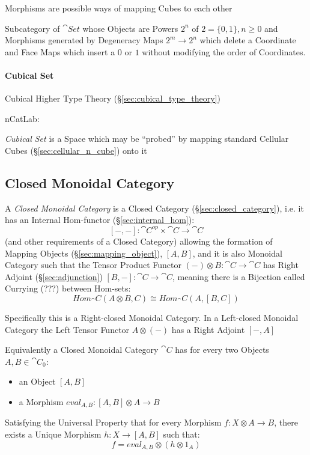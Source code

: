 Morphisms are possible ways of mapping Cubes to each other

Subcategory of $\cat{Set}$ whose Objects are Powers $2^n$ of $2 =
\{0,1\}, n \geq 0$ and Morphisms generated by Degeneracy Maps $2^m
\rightarrow 2^n$ which delete a Coordinate and Face Maps which insert
a $0$ or $1$ without modifying the order of Coordinates. %



\paragraph{Cubical Set}\label{sec:cubical_set}\hfill

Cubical Higher Type Theory (\S\ref{sec:cubical_type_theory})

nCatLab:

\emph{Cubical Set} is a Space which may be ``probed'' by mapping
standard Cellular Cubes (\S\ref{sec:cellular_n_cube}) onto it



\subsection{Closed Monoidal Category}\label{sec:closed_monoidal}

A \emph{Closed Monoidal Category} is a Closed Category
(\S\ref{sec:closed_category}), i.e. it has an Internal Hom-functor
(\S\ref{sec:internal_hom}):
\[
  [-,-] : \cat{C}^{op} \times \cat{C} \rightarrow \cat{C}
\]
(and other requirements of a Closed Category) allowing the formation
of Mapping Objects (\S\ref{sec:mapping_object}), $[A,B]$,
and it is also Monoidal Category such that the Tensor Product Functor
$(-) \otimes B : \cat{C} \rightarrow \cat{C}$ has Right Adjoint
(\S\ref{sec:adjunction}) $[B,-] : \cat{C} \rightarrow \cat{C}$,
meaning there is a Bijection called Currying (???) between Hom-sets:
\[
  Hom_\cat{C}(A \otimes B,C) \cong Hom_\cat{C}(A, [B,C])
\]

Specifically this is a Right-closed Monoidal Category. In a
Left-closed Monoidal Category the Left Tensor Functor $A \otimes (-)$
has a Right Adjoint $[-,A]$

Equivalently a Closed Monoidal Category $\cat{C}$ has for every two
Objects $A,B \in \cat{C}_0$:
\begin{itemize}
  \item an Object $[A,B]$
  \item a Morphism $eval_{A,B} : [A,B] \otimes A \rightarrow B$
\end{itemize}
Satisfying the Universal Property that for every Morphism $f : X
\otimes A \rightarrow B$, there exists a Unique Morphism $h : X
\rightarrow [A,B]$ such that:
\[
  f = eval_{A,B} \otimes (h \otimes 1_A)
\]

